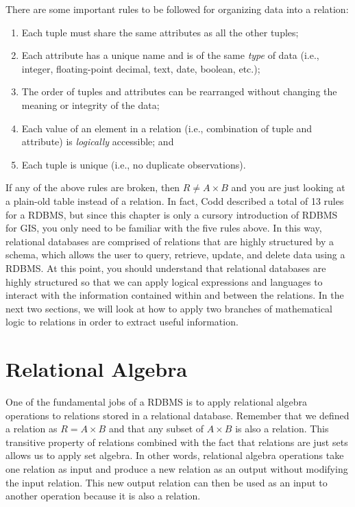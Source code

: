 \documentclass[
]{book}
\providecommand{\tightlist}{%
  \setlength{\itemsep}{0pt}\setlength{\parskip}{0pt}}
\begin{document}
There are some important rules to be followed for organizing data into a relation:

\begin{enumerate}
\def\labelenumi{\arabic{enumi}.}
\tightlist
\item
  Each tuple must share the same attributes as all the other tuples;
\item
  Each attribute has a unique name and is of the same \emph{type} of data (i.e., integer, floating-point decimal, text, date, boolean, etc.);
\item
  The order of tuples and attributes can be rearranged without changing the meaning or integrity of the data;
\item
  Each value of an element in a relation (i.e., combination of tuple and attribute) is \emph{logically} accessible; and
\item
  Each tuple is unique (i.e., no duplicate observations).
\end{enumerate}

If any of the above rules are broken, then \(R≠A×B\) and you are just looking at a plain-old table instead of a relation. In fact, Codd described a total of 13 rules for a RDBMS, but since this chapter is only a cursory introduction of RDBMS for GIS, you only need to be familiar with the five rules above. In this way, relational databases are comprised of relations that are highly structured by a schema, which allows the user to query, retrieve, update, and delete data using a RDBMS. At this point, you should understand that relational databases are highly structured so that we can apply logical expressions and languages to interact with the information contained within and between the relations. In the next two sections, we will look at how to apply two branches of mathematical logic to relations in order to extract useful information.

\hypertarget{relational-algebra}{%
\section{Relational Algebra}\label{relational-algebra}}

One of the fundamental jobs of a RDBMS is to apply relational algebra operations to relations stored in a relational database. Remember that we defined a relation as \(R=A×B\) and that any subset of \(A×B\) is also a relation. This transitive property of relations combined with the fact that relations are just sets allows us to apply set algebra. In other words, relational algebra operations take one relation as input and produce a new relation as an output without modifying the input relation. This new output relation can then be used as an input to another operation because it is also a relation.
\end{document}
